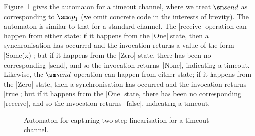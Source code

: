 Figure~\ref{fig:two-step-timeout-chan} gives the automaton for a timeout
channel, where we treat $\send$ as corresponding to $\op_1$ (we omit concrete
code in the interests of brevity).  The automaton is similar to that for a
standard channel.  The |receive| operation can happen from either state: if it
happens from the |One| state, then a synchronisation has occurred and the
invocation returns a value of the form |Some(x)|; but if it happens from the
|Zero| state, there has been no corresponding |send|, and so the invocation
returns~|None|, indicating a timeout.  Likewise, the $\overline{\send}$
operation can happen from either state; if it happens from the |Zero| state,
then a synchronisation has occurred and the invocation returns |true|; but if
it happens from the |One| state, there has been no corresponding |receive|,
and so the invocation returns~|false|, indicating a timeout.

\begin{figure}
\begin{center}
\end{center}
\caption{Automaton for capturing two-step linearisation for a timeout
  channel.}
\label{fig:two-step-timeout-chan}
\end{figure}




